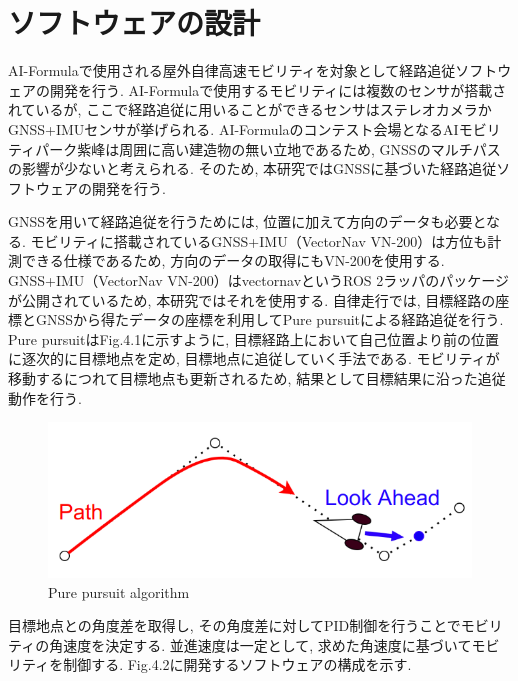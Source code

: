 
\section{ソフトウェアの設計}
AI-Formulaで使用される屋外自律高速モビリティを対象として経路追従ソフトウェアの開発を行う.
AI-Formulaで使用するモビリティには複数のセンサが搭載されているが, ここで経路追従に用いることができるセンサはステレオカメラかGNSS+IMUセンサが挙げられる.
AI-Formulaのコンテスト会場となるAIモビリティパーク紫峰は周囲に高い建造物の無い立地であるため, GNSSのマルチパスの影響が少ないと考えられる.
そのため, 本研究ではGNSSに基づいた経路追従ソフトウェアの開発を行う.


GNSSを用いて経路追従を行うためには, 位置に加えて方向のデータも必要となる.
モビリティに搭載されているGNSS+IMU（VectorNav VN-200）は方位も計測できる仕様であるため, 方向のデータの取得にもVN-200を使用する.
GNSS+IMU（VectorNav VN-200）はvectornav\cite{vectornav}というROS 2ラッパのパッケージが公開されているため, 本研究ではそれを使用する.
%
%
自律走行では, 目標経路の座標とGNSSから得たデータの座標を利用してPure pursuitによる経路追従を行う.
Pure pursuitはFig.4.1に示すように, 目標経路上において自己位置より前の位置に逐次的に目標地点を定め, 目標地点に追従していく手法である.
モビリティが移動するにつれて目標地点も更新されるため, 結果として目標結果に沿った追従動作を行う.
% 
\begin{figure}[H]
  \centering
 \includegraphics[keepaspectratio, scale=0.5]
      {images/PurePursuit.png}
 \caption{Pure pursuit algorithm}
 \label{fig:system}
\end{figure}
目標地点との角度差を取得し, その角度差に対してPID制御を行うことでモビリティの角速度を決定する.
並進速度は一定として, 求めた角速度に基づいてモビリティを制御する.
Fig.4.2に開発するソフトウェアの構成を示す.

